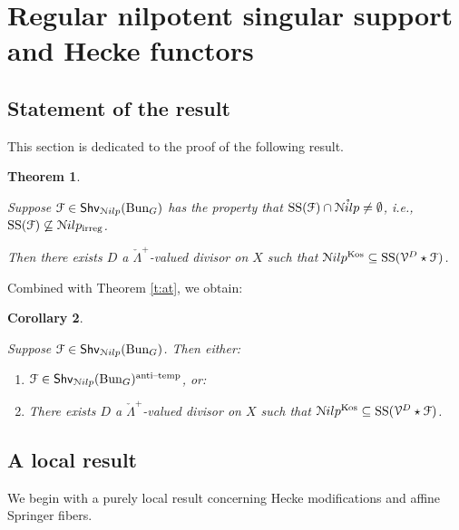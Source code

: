 \documentclass[reqno,11pt]{amsart}
\numberwithin{equation}{subsection}
\newtheorem{thm}{Theorem}[subsubsection]
\newtheorem{cor}[thm]{Corollary}
\theoremstyle{remark}
\newcommand{\sF}{{\EuScript F}}
\newcommand{\sN}{{\EuScript N}}
\newcommand{\sV}{{\EuScript V}}
\newcommand{\on}{\operatorname}
\newcommand{\mathendash}{\text{\textendash}}
\newcommand{\Bun}{\on{Bun}}
\renewcommand{\o}[1]{\mathring{#1}}
\renewcommand{\subset}{\subseteq}
\newcommand{\Shv}{\mathsf{Shv}}
\newcommand{\at}{\on{anti}\!\mathendash\!\on{temp}}
\newcommand{\Nilp}{\sN ilp}
\newcommand{\Kos}{\on{Kos}}
\newcommand{\irreg}{\on{irreg}}
\renewcommand{\SS}{\on{SS}}
\begin{document}
\section{Regular nilpotent singular support and Hecke functors}\label{s:hecke-to-kostant}

\subsection{Statement of the result}

This section is dedicated to the proof of the following result.

\begin{thm}\label{t:hecke-to-kostant}

Suppose $\sF \in \Shv_{\Nilp}(\Bun_G)$ has the property 
that $\SS(\sF) \cap \o{\Nilp} \neq \emptyset$, i.e., 
$\SS(\sF) \not\subset \Nilp_{\irreg}$.

Then there exists $D$ a $\check{\Lambda}^+$-valued divisor on $X$
such that $\Nilp^{\Kos} \subset \SS(\sV^D \star \sF)$.

\end{thm}

Combined with Theorem \ref{t:at}, we obtain:

\begin{cor}\label{c:hecke-to-kostant}

Suppose $\sF \in \Shv_{\Nilp}(\Bun_G)$. Then either:

\begin{enumerate}

\item $\sF \in \Shv_{\Nilp}(\Bun_G)^{\at}$, or:

\item There exists $D$ a $\check{\Lambda}^+$-valued divisor on $X$
such that $\Nilp^{\Kos} \subset \SS(\sV^D \star \sF)$.

\end{enumerate}

\end{cor}

\subsection{A local result}

We begin with a purely local result concerning Hecke modifications 
and affine Springer fibers.

\subsubsection{}
\end{document}
